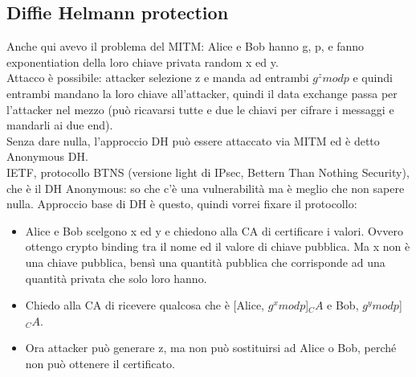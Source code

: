 \documentclass[16px]{article}
\begin{document}
\subsection{Diffie Helmann protection}
Anche qui avevo il problema del MITM: Alice e Bob hanno g, p, e fanno exponentiation della loro chiave privata random x ed y.\\ Attacco è possibile: attacker selezione z e manda ad entrambi $g^zmodp$ e quindi entrambi mandano la loro chiave all'attacker, quindi il data exchange passa per l'attacker nel mezzo (può ricavarsi tutte e due le chiavi per cifrare i messaggi e mandarli ai due end).\\ Senza dare nulla, l'approccio DH può essere attaccato via MITM ed è detto Anonymous DH.\\ IETF, protocollo BTNS (versione light di IPsec, Bettern Than Nothing Security), che è il DH Anonymous: so che c'è una vulnerabilità ma è meglio che non sapere nulla. Approccio base di DH è questo, quindi vorrei fixare il protocollo: 
\begin{itemize}
\item Alice e Bob scelgono x ed y e chiedono alla CA di certificare i valori. Ovvero ottengo crypto binding tra il nome ed il valore di chiave pubblica. Ma x non è una chiave pubblica, bensì una quantità pubblica che corrisponde ad una quantità privata che solo loro hanno.
\item Chiedo alla CA di ricevere qualcosa che è [Alice, $g^xmodp$]$_CA$ e Bob, $g^ymodp$]$_CA$.
\item Ora attacker può generare z, ma non può sostituirsi ad Alice o Bob, perché non può ottenere il certificato. 
\end{itemize}
\end{document}
